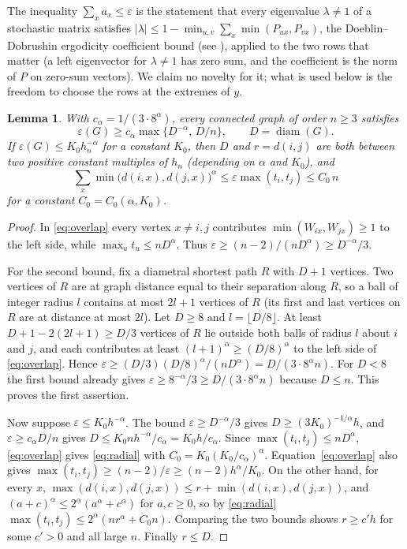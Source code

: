 \documentclass[11pt,a4paper]{article}
\newtheorem{lemma}[theorem]{Lemma}
\theoremstyle{definition}
\newcommand{\eps}{\varepsilon}
\newcommand{\diam}{\operatorname{diam}}
\begin{document}
The inequality $\sum_x a_x\le\eps$ is the statement that every eigenvalue $\lambda\ne1$ of a stochastic matrix satisfies $|\lambda|\le1-\min_{u,v}\sum_x\min(P_{ux},P_{vx})$, the Doeblin--Dobrushin ergodicity coefficient bound (see \cite[equations (1)--(2)]{gq}), applied to the two rows that matter (a left eigenvector for $\lambda\ne1$ has zero sum, and the coefficient is the norm of $P$ on zero-sum vectors). We claim no novelty for it; what is used below is the freedom to choose the rows at the extremes of $y$.

\begin{lemma}\label{lem:coarse}
With $c_\alpha=1/(3\cdot8^\alpha)$, every connected graph of order $n\ge3$ satisfies
\[
 \eps(G)\ge c_\alpha\max\{D^{-\alpha},\,D/n\},\qquad D=\diam(G).
\]
If $\eps(G)\le K_0h_n^{-\alpha}$ for a constant $K_0$, then $D$ and $r=d(i,j)$ are both between two positive constant multiples of $h_n$ (depending on $\alpha$ and $K_0$), and
\begin{equation}\label{eq:radial}
 \sum_x\min\big(d(i,x),d(j,x)\big)^\alpha\le\eps\max(t_i,t_j)\le C_0\,n
\end{equation}
for a constant $C_0=C_0(\alpha,K_0)$.
\end{lemma}
\begin{proof}
In \eqref{eq:overlap} every vertex $x\ne i,j$ contributes $\min(W_{ix},W_{jx})\ge1$ to the left side, while $\max_ut_u\le nD^\alpha$. Thus $\eps\ge(n-2)/(nD^\alpha)\ge D^{-\alpha}/3$.

For the second bound, fix a diametral shortest path $R$ with $D+1$ vertices. Two vertices of $R$ are at graph distance equal to their separation along $R$, so a ball of integer radius $l$ contains at most $2l+1$ vertices of $R$ (its first and last vertices on $R$ are at distance at most $2l$). Let $D\ge8$ and $l=\lfloor D/8\rfloor$. At least $D+1-2(2l+1)\ge D/3$ vertices of $R$ lie outside both balls of radius $l$ about $i$ and $j$, and each contributes at least $(l+1)^\alpha\ge(D/8)^\alpha$ to the left side of \eqref{eq:overlap}. Hence $\eps\ge(D/3)(D/8)^\alpha/(nD^\alpha)=D/(3\cdot8^\alpha n)$. For $D<8$ the first bound already gives $\eps\ge8^{-\alpha}/3\ge D/(3\cdot 8^\alpha n)$ because $D\le n$. This proves the first assertion.

Now suppose $\eps\le K_0h^{-\alpha}$. The bound $\eps\ge D^{-\alpha}/3$ gives $D\ge(3K_0)^{-1/\alpha}h$, and $\eps\ge c_\alpha D/n$ gives $D\le K_0 n h^{-\alpha}/c_\alpha=K_0h/c_\alpha$. Since $\max(t_i,t_j)\le nD^\alpha$, \eqref{eq:overlap} gives \eqref{eq:radial} with $C_0=K_0(K_0/c_\alpha)^\alpha$. Equation~\eqref{eq:overlap} also gives $\max(t_i,t_j)\ge(n-2)/\eps\ge(n-2)h^\alpha/K_0$. On the other hand, for every $x$, $\max(d(i,x),d(j,x))\le r+\min(d(i,x),d(j,x))$, and $(a+c)^\alpha\le2^{\alpha}(a^\alpha+c^\alpha)$ for $a,c\ge0$, so by \eqref{eq:radial} $\max(t_i,t_j)\le2^{\alpha}(nr^\alpha+C_0n)$. Comparing the two bounds shows $r\ge c'h$ for some $c'>0$ and all large $n$. Finally $r\le D$.
\end{proof}
\end{document}
